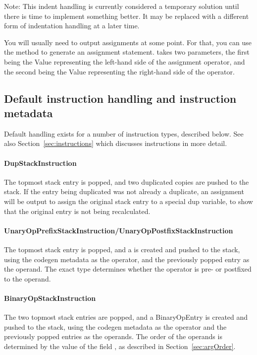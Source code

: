 Note: This indent handling is currently considered a temporary solution until there is time to implement something better. It may be replaced with a different form of indentation handling at a later time.

You will usually need to output assignments at some point. For that, you can use the  method to generate an assignment statement.  takes two parameters, the first being the Value representing the left-hand side of the assignment operator, and the second being the Value representing the right-hand side of the operator.

\subsection{Default instruction handling and instruction metadata}
Default handling exists for a number of instruction types, described below. See also Section~\vref{sec:instructions} which discusses instructions in more detail.
\paragraph{DupStackInstruction}
The topmost stack entry is popped, and two duplicated copies are pushed to the stack. If the entry being duplicated was not already a duplicate, an assignment will be output to assign the original stack entry to a special dup variable, to show that the original entry is not being recalculated.

\paragraph{UnaryOpPrefixStackInstruction/UnaryOpPostfixStackInstruction}
The topmost stack entry is popped, and a  is created and pushed to the stack, using the codegen metadata as the operator, and the previously popped entry as the operand. The exact type determines whether the operator is pre- or postfixed to the operand.

\paragraph{BinaryOpStackInstruction}
The two topmost stack entries are popped, and a BinaryOpEntry is created and pushed to the stack, using the codegen metadata as the operator and the previously popped entries as the operands. The order of the operands is determined by the value of the field , as described in Section~\vref{sec:argOrder}.

